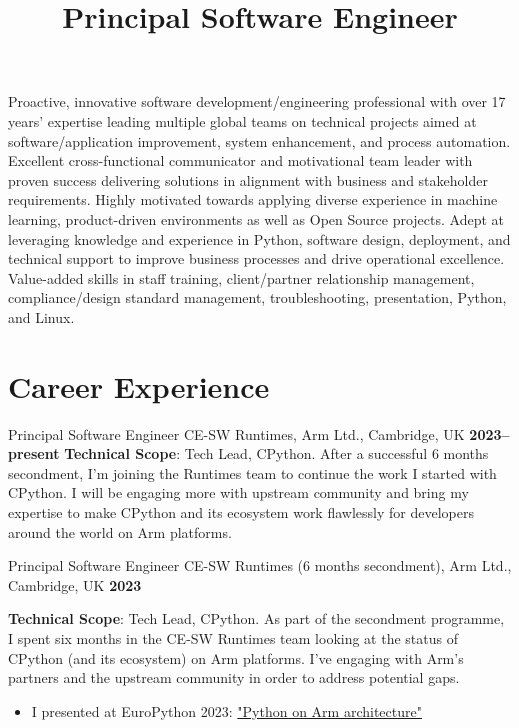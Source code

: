 \documentclass[10pt,a4paper,sans]{moderncv}
\title{Principal Software Engineer}
\begin{document}
\maketitle
Proactive, innovative software development/engineering
professional with over 17 years’ expertise leading multiple global teams on
technical projects aimed at software/application improvement, system
enhancement, and process automation. Excellent cross-functional communicator
and motivational team leader with proven success delivering solutions in
alignment with business and stakeholder requirements. Highly motivated towards
applying diverse experience in machine learning, product-driven
environments as well as Open Source projects. Adept at leveraging knowledge
and experience in Python, software design, deployment, and technical support
to improve business processes and drive operational excellence.
Value-added skills in staff training, client/partner relationship management,
compliance/design standard management, troubleshooting, presentation, Python,
and Linux.

\section{Career Experience}


\cventry{}
    {Principal Software Engineer}
		{CE-SW Runtimes, Arm Ltd., Cambridge, UK}
    {\textbf{2023--present}}
    {}
    {\textbf{Technical Scope}: Tech Lead, CPython.\newline
		After a successful 6 months secondment, I’m joining the
		Runtimes team to continue the work I started with CPython.
		I will be engaging more with upstream community and bring my
		expertise to make CPython and its ecosystem work flawlessly
		for developers around the world on Arm platforms.}

\cventry{}
    {Principal Software Engineer}
		{CE-SW Runtimes (6 months secondment), Arm Ltd., Cambridge, UK}
    {\textbf{2023}}
    {}
    {\textbf{Technical Scope}: Tech Lead, CPython.\newline
		As part of the secondment programme, I spent six months in the CE-SW
		Runtimes team looking at the status of CPython (and its ecosystem)
		on Arm platforms.
		I've engaging with Arm's partners and the upstream community in
		order to address potential gaps.
    \begin{itemize}
			\item I presented at EuroPython 2023:
				\href{https://www.youtube.com/watch?v=nYf7r0lkTIs}{"Python on Arm architecture"}
    \end{itemize}}
\end{document}
